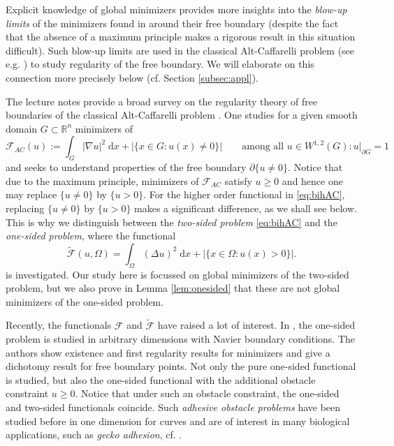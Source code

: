 \documentclass[twoside,11pt]{article}
\theoremstyle{definition}
\begin{document}
 Explicit knowledge of global minimizers provides
 more insights into the 
 \emph{blow-up limits} of the minimizers found in \cite{GMMathAnn} around their free boundary (despite the fact that the absence of a maximum principle makes a rigorous result in this situation 
 difficult). Such blow-up limits are used in the classical Alt-Caffarelli problem (see e.g. \cite[Theorem 1.2 and the outline of its proof]{Velichkov})
 to study regularity of the free boundary. We will elaborate on this connection more precisely below (cf. Section \ref{subsec:appl}).   
 
The lecture notes  \cite{Velichkov} provide a broad survey on the  regularity theory of free boundaries of the classical Alt-Caffarelli problem \cite{AltCaffarelli}. 
One studies for a given smooth domain $G \subset \mathbb{R}^n$ minimizers of 
\begin{equation}\label{eq:ACclassical}
    \mathcal{F}_{AC}(u) := \int_G |\nabla u|^2 \; \mathrm{d}x + |\{ x \in G:  u(x) \neq 0 \}| \qquad \textrm{among all $u \in W^{1,2}(G): u \vert_{\partial G} = 1$}
\end{equation}
and seeks to understand properties of 
the free boundary $\partial \{u \neq 0 \}$. Notice that due to the maximum principle, minimizers of $\mathcal{F}_{AC}$ satisfy $u \geq 0$ and hence one may replace $\{ u \neq 0\}$ by $\{ u> 0\}$. For the higher order functional in \eqref{eq:bihAC}, replacing $\{ u \neq 0\}$ by $\{ u> 0\}$ makes a significant difference, as we shall see below. This is why we distinguish between the \emph{two-sided problem}  \eqref{eq:bihAC} and the \emph{one-sided problem}, where  the functional 
\begin{equation*}
    \tilde{\mathcal{F}}(u,\Omega)= \int_\Omega (\Delta u)^2 \; \mathrm{d}x + | \{x \in \Omega : u(x) > 0 \}|. 
\end{equation*}
is investigated. 
Our study here is focussed on global minimizers of 
the two-sided problem, but we also prove in Lemma \ref{lem:onesided} that these are not global minimizers of the one-sided problem.


Recently, the functionals $\mathcal{F}$ and $\tilde{\mathcal{F}}$ 
have raised a lot of interest. In \cite{DKV19,DKV20}, the one-sided problem is
studied in arbitrary dimensions with Navier boundary conditions. The authors show existence and first regularity results for minimizers and give a dichotomy result for free boundary points. Not only the pure one-sided functional is studied, but also the one-sided functional with the additional obstacle constraint $u \geq 0$. Notice that under such an 
obstacle constraint, the one-sided and two-sided functionals coincide. Such \emph{adhesive obstacle problems} have been studied before in one dimension for curves \cite{Miura1, Miura2} and are of interest in many biological applications, such as \emph{gecko adhesion}, cf. \cite{PerssonGorb}. 
\end{document}
